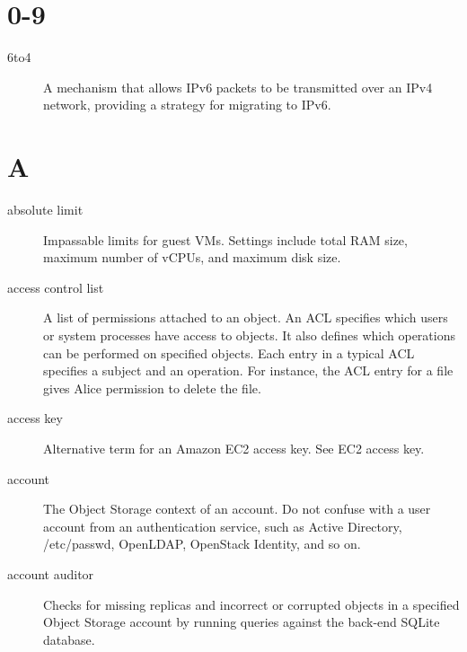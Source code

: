 \documentclass[letterpaper,10pt,english]{sphinxmanual}
\begin{document}
\section{0-9}
\label{_source/glossary:id1}\begin{description}
\item[{6to4}] \leavevmode{}\label{_source/glossary:term-to4}
A mechanism that allows IPv6 packets to be transmitted
over an IPv4 network, providing a strategy for migrating to
IPv6.

\end{description}


\section{A}
\label{_source/glossary:a}\begin{description}
\item[{absolute limit}] \leavevmode{}\label{_source/glossary:term-absolute-limit}
Impassable limits for guest VMs. Settings include total RAM
size, maximum number of vCPUs, and maximum disk size.

\item[{access control list}] \leavevmode{}\label{_source/glossary:term-access-control-list}
A list of permissions attached to an object. An ACL specifies
which users or system processes have access to objects. It also
defines which operations can be performed on specified objects. Each
entry in a typical ACL specifies a subject and an operation. For
instance, the ACL entry  for a file gives
Alice permission to delete the file.

\item[{access key}] \leavevmode{}\label{_source/glossary:term-access-key}
Alternative term for an Amazon EC2 access key. See EC2 access
key.

\item[{account}] \leavevmode{}\label{_source/glossary:term-account}
The Object Storage context of an account. Do not confuse with a
user account from an authentication service, such as Active Directory,
/etc/passwd, OpenLDAP, OpenStack Identity, and so on.

\item[{account auditor}] \leavevmode{}\label{_source/glossary:term-account-auditor}
Checks for missing replicas and incorrect or corrupted objects
in a specified Object Storage account by running queries against the
back-end SQLite database.


\end{description}
\end{document}
